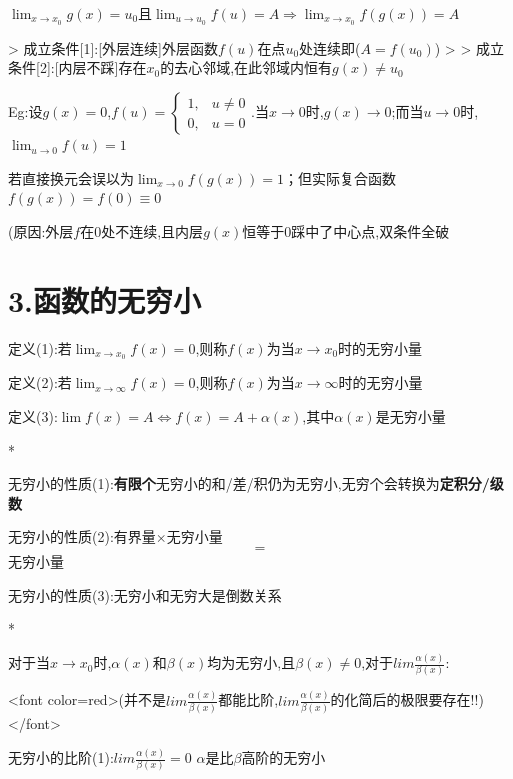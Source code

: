 \documentclass[11pt,a4paper,UTF8]{ctexart}
\begin{document}
    $\lim_{x \to x_0} g(x) = u_0$且$\lim_{u \to u_0} f(u) = A\Rightarrow\lim_{x \to x_0} f(g(x)) = A$

\begin{solbox}[{分步推导与答题规范}]
    >   成立条件[1]:[外层连续]外层函数$f(u)$在点$u_0$处连续即($A = f(u_0)$)
    >
    >   成立条件[2]:[内层不踩]存在$x_0$的去心邻域,在此邻域内恒有$g(x) \neq u_0$
\end{solbox}

    Eg:设$g(x) = 0$,$f(u) = \begin{cases} 1, & u \neq 0 \\ 0, & u = 0 \end{cases}$.当$x \to 0$时,$g(x) \to 0$;而当$u \to 0$时,$\lim_{u \to 0} f(u) = 1$

    若直接换元会误以为$\lim_{x \to 0} f(g(x)) = 1$；但实际复合函数$f(g(x)) = f(0) \equiv 0$

    (原因:外层$f$在0处不连续,且内层$g(x)$恒等于0踩中了中心点,双条件全破


\section{3.函数的无穷小}

    定义(1):若$\lim_{x \to x_0} f(x) = 0$,则称$f(x)$为当$x \to x_0$时的无穷小量

    定义(2):若$\lim_{x \to \infty} f(x) = 0$,则称$f(x)$为当$x \to \infty$时的无穷小量

    定义(3):$\lim f(x) = A \iff f(x) = A + \alpha(x)$,其中$\alpha(x)$是无穷小量

    \textit{}*

    无穷小的性质(1):\textbf{有限个}无穷小的和/差/积仍为无穷小,无穷个会转换为\textbf{定积分/级数}

    无穷小的性质(2):有界量$\times$无穷小量
\begin{equation*}
=
\end{equation*}
无穷小量

    无穷小的性质(3):无穷小和无穷大是倒数关系

    \textit{}*

    \textit{}对于当$x \to x_0$时,$\alpha(x)$和$\beta(x)$均为无穷小,且$\beta(x) \ne 0$,对于$lim\frac{\alpha(x)}{\beta(x)}$:\textit{}

    \textit{}<font color=red>(并不是$lim\frac{\alpha(x)}{\beta(x)}$都能比阶,$lim\frac{\alpha(x)}{\beta(x)}$的化简后的极限要存在!!)</font>\textit{}

    无穷小的比阶(1):$lim\frac{\alpha(x)}{\beta(x)}=0$	$\alpha$是比$\beta$高阶的无穷小
\end{document}
